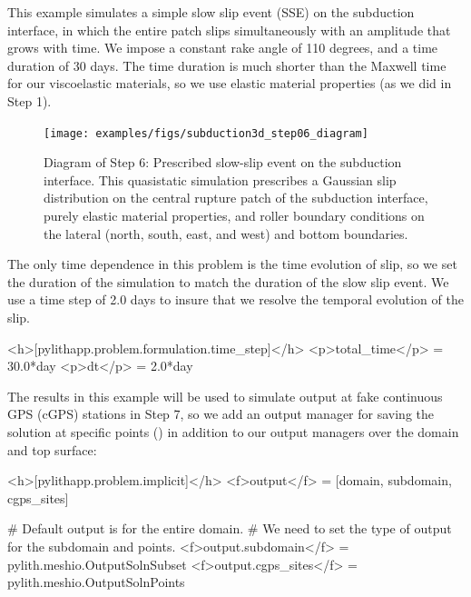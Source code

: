 This example simulates a simple slow slip event (SSE) on the
subduction interface, in which the entire patch slips simultaneously
with an amplitude that grows with time. We impose a constant rake
angle of 110 degrees, and a time duration of 30 days. The time
duration is much shorter than the Maxwell time for our viscoelastic
materials, so we use elastic material properties (as we did in Step 1).

\begin{figure}[htbp]
  \texttt{[image: examples/figs/subduction3d\_step06\_diagram]}
  \caption{Diagram of Step 6: Prescribed slow-slip event on the
    subduction interface. This quasistatic simulation prescribes a
    Gaussian slip distribution on the central rupture patch of the
    subduction interface, purely elastic material properties, and
    roller boundary conditions on the lateral (north, south, east, and
    west) and bottom boundaries.}
  \label{fig:example:subduction:3d:step06:diagram}
\end{figure}


The only time dependence in this problem is the time evolution of
slip, so we set the duration of the simulation to match the duration
of the slow slip event. We use a time step of 2.0 days to insure that
we resolve the temporal evolution of the slip.
\begin{cfg}
<h>[pylithapp.problem.formulation.time_step]</h>
<p>total_time</p> = 30.0*day
<p>dt</p> = 2.0*day
\end{cfg}

The results in this example will be used to simulate output at fake
continuous GPS (cGPS) stations in Step 7, so we add an output manager
for saving the solution at specific points ()
in addition to our output managers over the domain and top surface:
\begin{cfg}
<h>[pylithapp.problem.implicit]</h>
<f>output</f> = [domain, subdomain, cgps_sites]

# Default output is for the entire domain.
# We need to set the type of output for the subdomain and points.
<f>output.subdomain</f> = pylith.meshio.OutputSolnSubset
<f>output.cgps_sites</f> = pylith.meshio.OutputSolnPoints
\end{cfg}


